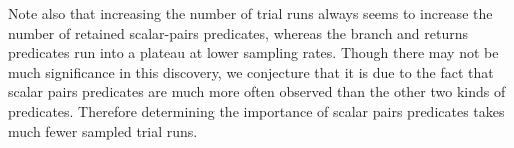 Note also that increasing 
the number of trial runs always seems to increase the number of retained 
scalar-pairs predicates, whereas the branch and returns predicates run into 
a plateau at lower sampling rates.  Though there may not be much significance 
in this discovery, we conjecture that it is due to the fact that scalar
pairs predicates are much more often observed than the other two kinds of
predicates.  Therefore determining the importance of scalar pairs predicates
takes much fewer sampled trial runs.




